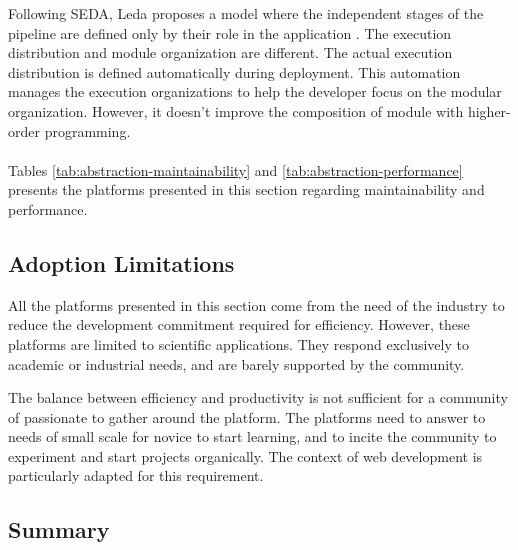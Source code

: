 Following SEDA, Leda proposes a model where the independent stages of the pipeline are defined only by their role in the application \cite{Salmito2013,Salmito2014}.
The execution distribution and module organization are different.
The actual execution distribution is defined automatically during deployment. %
This automation manages the execution organizations to help the developer focus on the modular organization.
However, it doesn't improve the composition of module with higher-order programming.

\paragraph{}

Tables \ref{tab:abstraction-maintainability} and \ref{tab:abstraction-performance} presents the platforms presented in this section regarding maintainability and performance.





\subsection{Adoption Limitations}

All the platforms presented in this section come from the need of the industry to reduce the development commitment required for efficiency.
However, these platforms are limited to scientific applications.
They respond exclusively to academic or industrial needs, and are barely supported by the community.

The balance between efficiency and productivity is not sufficient for a community of passionate to gather around the platform.
The platforms need to answer to needs of small scale for novice to start learning, and to incite the community to experiment and start projects organically.
The context of web development is particularly adapted for this requirement.


\subsection{Summary}

